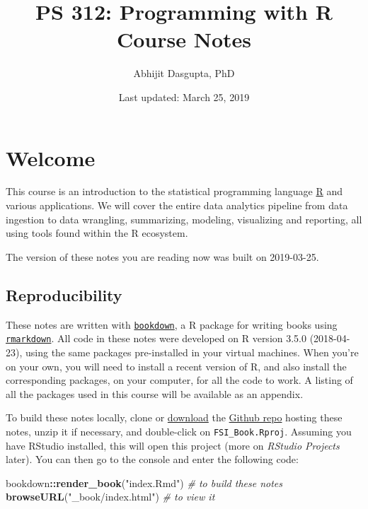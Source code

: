 \documentclass[12pt,letterpaperpaper,openany]{book}
\title{PS 312: Programming with R\\
Course Notes}
\author{Abhijit Dasgupta, PhD}
\date{Last updated: March 25, 2019}
\newenvironment{Shaded}{\begin{snugshade}}{\end{snugshade}}
\newcommand{\CommentTok}[1]{\textcolor[rgb]{0.56,0.35,0.01}{\textit{#1}}}
\newcommand{\KeywordTok}[1]{\textcolor[rgb]{0.13,0.29,0.53}{\textbf{#1}}}
\newcommand{\NormalTok}[1]{#1}
\newcommand{\OperatorTok}[1]{\textcolor[rgb]{0.81,0.36,0.00}{\textbf{#1}}}
\newcommand{\StringTok}[1]{\textcolor[rgb]{0.31,0.60,0.02}{#1}}
\begin{document}
\maketitle

\hypertarget{welcome}{%
\chapter*{Welcome}\label{welcome}}

This course is an introduction to the statistical programming language
\href{http://www.r-project.org}{R} and various applications. We will cover the entire data analytics pipeline from data ingestion to data wrangling, summarizing, modeling, visualizing and reporting, all using tools found within the R ecosystem.

The version of these notes you are reading now was built on
2019-03-25.

\hypertarget{reproducibility}{%
\section*{Reproducibility}\label{reproducibility}}

These notes are written with \href{https://bookdown.org}{\texttt{bookdown}}, a R package for writing books using \href{https://rmarkdown.rstudio.com}{\texttt{rmarkdown}}.
All code in these notes were developed on R version 3.5.0 (2018-04-23), using
the same packages pre-installed in your virtual machines. When you're on your
own, you will need to install a recent version of R, and also install the
corresponding packages, on your computer, for all the code to work. A listing of
all the packages used in this course will be available as an appendix.

To build these notes locally, clone or \href{https://github.com/araastat/FSI_Book/archive/master.zip}{download} the
\href{https://github.com/araastat/FSI_Book}{Github repo} hosting these notes, unzip it if necessary, and double-click on \texttt{FSI\_Book.Rproj}. Assuming you have RStudio installed, this will open this project (more on \emph{RStudio Projects} later). You can then go to the console and enter the following code:

\begin{Shaded}
\begin{Highlighting}[]
\NormalTok{bookdown}\OperatorTok{::}\KeywordTok{render_book}\NormalTok{(}\StringTok{"index.Rmd"}\NormalTok{) }\CommentTok{# to build these notes}
\KeywordTok{browseURL}\NormalTok{(}\StringTok{"_book/index.html"}\NormalTok{) }\CommentTok{# to view it}
\end{Highlighting}
\end{Shaded}
\end{document}
